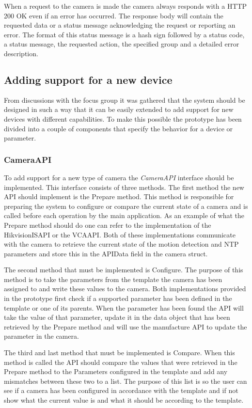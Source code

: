 When a request to the camera is made the camera always responds with a HTTP 200 OK even if an error has occurred.
The response body will contain the requested data or a status message acknowledging the request or reporting an error.
The format of this status message is a hash sign followed by a status code, a status message, the requested action, the specified group and a detailed error description.

\subsection{Adding support for a new device}
From discussions with the focus group it was gathered that the system should be designed in such a way that it can be easily extended to add support for new devices with different capabilities.
To make this possible the prototype has been divided into a couple of components that specify the behavior for a device or parameter.

\subsubsection{CameraAPI}
To add support for a new type of camera the \emph{CameraAPI} interface should be implemented.
This interface consists of three methods.
The first method the new API should implement is the Prepare method.
This method is responsible for preparing the system to configure or compare the current state of a camera and is called before each operation by the main application.
As an example of what the Prepare method should do one can refer to the implementation of the HikvisionISAPI or the VCAAPI.
Both of these implementations communicate with the camera to retrieve the current state of the motion detection and NTP parameters and store this in the APIData field in the camera struct.

The second method that must be implemented is Configure.
The purpose of this method is to take the parameters from the template the camera has been assigned to and write these values to the camera.
Both implementations provided in the prototype first check if a supported parameter has been defined in the template or one of its parents.
When the parameter has been found the API will take the value of that parameter, update it in the data object that has been retrieved by the Prepare method and will use the manufacture API to update the parameter in the camera.

The third and last method that must be implemented is Compare.
When this method is called the API should compare the values that were retrieved in the Prepare method to the Parameters configured in the template and add any mismatches between these two to a list.
The purpose of this list is so the user can see if a camera has been configured in accordance with the template and if not show what the current value is and what it should be according to the template.

